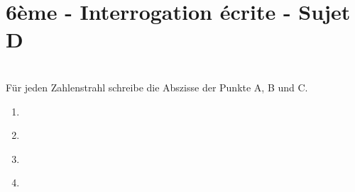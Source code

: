 \documentclass[10pt,openany]{book}
\begin{document}
\pagestyle{empty}
\section*{6\`eme - Interrogation \'ecrite - Sujet D}

\\
F\"ur jeden Zahlenstrahl schreibe die Abszisse der Punkte A, B und C.
\begin{enumerate}
\item
\begin{minipage}{18cm}
\begin{DroiteGraduee}[none]{15}{0}{7}{5}{1}{0}{0}
\end{DroiteGraduee}
\end{minipage}
\item
\begin{minipage}{18cm}
\begin{DroiteGraduee}[none]{15}{0}{7}{10}{1}{0}{0}
\end{DroiteGraduee}
\end{minipage}
\item
\begin{minipage}{18cm}
\begin{DroiteGraduee}[none]{15}{0}{5}{10}{1}{0.08}{0}
\end{DroiteGraduee}
\end{minipage}
\item
\begin{minipage}{18cm}
\begin{DroiteGraduee}[none]{15}{0}{2}{10}{1}{0}{0}
\end{DroiteGraduee}
\end{minipage}
\end{enumerate}
\end{document}
